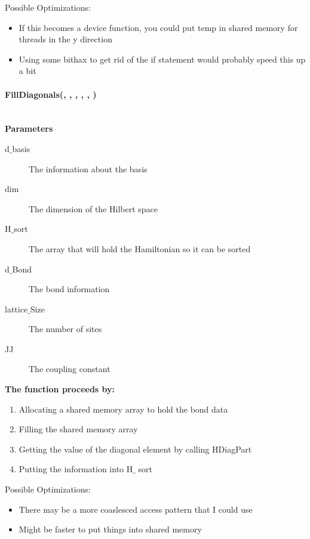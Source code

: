 \documentclass{article}
\begin{document}
{Possible Optimizations:
\begin{itemize}
\item{If this becomes a device function, you could put temp in shared memory for threads in the y direction}
\item{Using some bithax to get rid of the if statement would probably speed this up a bit}
\end{itemize}

\paragraph{\cudaglobal \void FillDiagonals(\ptrint, \int, \hamstruct, \ptrint, \int, \double) \\ \\}
\noindent\textbf{Parameters}
\begin{description}
\item[\ptrint d$\_$basis] The information about the basis
\item[\int dim] The dimension of the Hilbert space
\item[\hamstruct H$\_$sort] The array that will hold the Hamiltonian so it can be sorted
\item[\ptrint d$\_$Bond] The bond information
\item[\int lattice$\_$Size] The number of sites
\item[\double JJ] The coupling constant
\end{description}

\noindent\textbf{The function proceeds by:}
\begin{enumerate}
\item{Allocating a shared memory array to hold the bond data}
\item{Filling the shared memory array}
\item{Getting the value of the diagonal element by calling HDiagPart}
\item{Putting the information into H$\_$ sort}
\end{enumerate}

Possible Optimizations:
\begin{itemize}
\item{There may be a more coaslesced access pattern that I could use}
\item{Might be faster to put things into shared memory}
\end{itemize}


}
\end{document}
